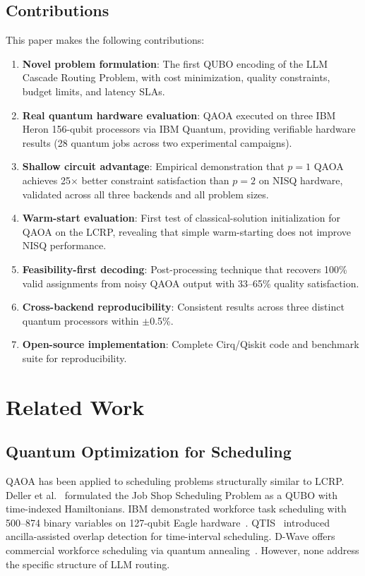 \documentclass[conference]{IEEEtran}
\begin{document}
\subsection{Contributions}

This paper makes the following contributions:

\begin{enumerate}
    \item \textbf{Novel problem formulation}: The first QUBO encoding of the LLM Cascade Routing Problem, with cost minimization, quality constraints, budget limits, and latency SLAs.
    \item \textbf{Real quantum hardware evaluation}: QAOA executed on three IBM Heron 156-qubit processors via IBM Quantum, providing verifiable hardware results (28 quantum jobs across two experimental campaigns).
    \item \textbf{Shallow circuit advantage}: Empirical demonstration that $p\!=\!1$ QAOA achieves 25$\times$ better constraint satisfaction than $p\!=\!2$ on NISQ hardware, validated across all three backends and all problem sizes.
    \item \textbf{Warm-start evaluation}: First test of classical-solution initialization for QAOA on the LCRP, revealing that simple warm-starting does not improve NISQ performance.
    \item \textbf{Feasibility-first decoding}: Post-processing technique that recovers 100\% valid assignments from noisy QAOA output with 33--65\% quality satisfaction.
    \item \textbf{Cross-backend reproducibility}: Consistent results across three distinct quantum processors within $\pm$0.5\%.
    \item \textbf{Open-source implementation}: Complete Cirq/Qiskit code and benchmark suite for reproducibility.
\end{enumerate}

\section{Related Work}

\subsection{Quantum Optimization for Scheduling}

QAOA has been applied to scheduling problems structurally similar to LCRP. Deller et al.~\cite{deller2023jssp} formulated the Job Shop Scheduling Problem as a QUBO with time-indexed Hamiltonians. IBM demonstrated workforce task scheduling with 500--874 binary variables on 127-qubit Eagle hardware~\cite{ibm2024workforce}. QTIS~\cite{qtis2025} introduced ancilla-assisted overlap detection for time-interval scheduling. D-Wave offers commercial workforce scheduling via quantum annealing~\cite{dwave2024}. However, none address the specific structure of LLM routing.
\end{document}
